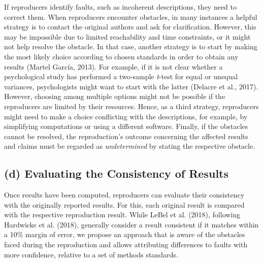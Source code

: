 \documentclass[authordate, empirical]{jote-new-article}
\begin{document}
	If reproducers identify faults, such as incoherent descriptions, they need to correct them. When reproducers encounter obstacles, in many instances a helpful strategy is to contact the original authors and ask for clarification. However, this may be impossible due to limited reachability and time constraints, or it might not help resolve the obstacle. In that case, another strategy is to start by making the most likely choice according to chosen standards in order to obtain any results (Martel García, 2013). For example, if it is not clear whether a psychological study has performed a two-sample \emph{t}-test for equal or unequal variances, psychologists might want to start with the latter (Delacre et al., 2017). However, choosing among multiple options might not be possible if the reproducers are limited by their resources. Hence, as a third strategy, reproducers might need to make a choice conflicting with the descriptions, for example, by simplifying computations or using a different software. Finally, if the obstacles cannot be resolved, the reproduction's outcome concerning the affected results and claims must be regarded as \emph{undetermined} by stating the respective obstacle.



	\subsection{(d) Evaluating the Consistency of Results}



	Once results have been computed, reproducers can evaluate their consistency with the originally reported results. For this, each original result is compared with the respective reproduction result. While LeBel et al. (2018), following Hardwicke et al. (2018), generally consider a result consistent if it matches within a 10\% margin of error, we propose an approach that is aware of the obstacles faced during the reproduction and allows attributing differences to faults with more confidence, relative to a set of methods standards.
\end{document}
